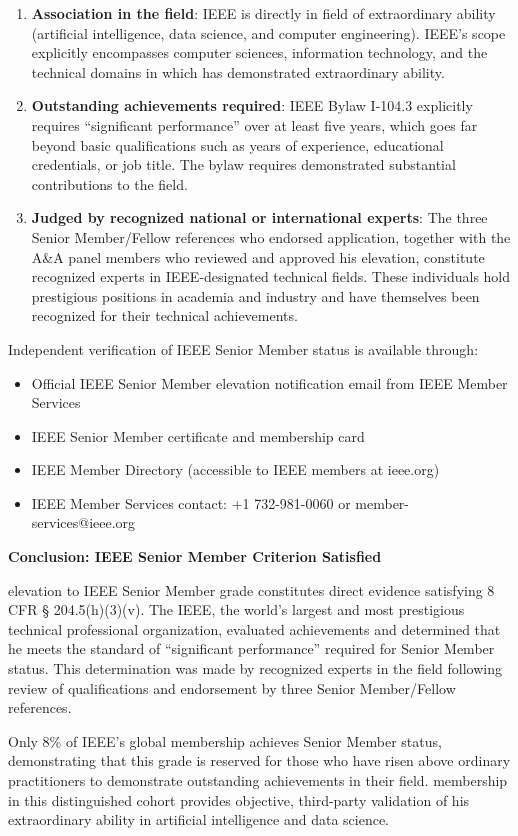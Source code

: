 \begin{enumerate}
    \item \textbf{Association in the field}: IEEE is directly in \drs field of extraordinary ability (artificial intelligence, data science, and computer engineering). IEEE's scope explicitly encompasses computer sciences, information technology, and the technical domains in which \dr has demonstrated extraordinary ability.
    
    \item \textbf{Outstanding achievements required}: IEEE Bylaw I-104.3 explicitly requires ``significant performance'' over at least five years, which goes far beyond basic qualifications such as years of experience, educational credentials, or job title. The bylaw requires demonstrated substantial contributions to the field.
    
    \item \textbf{Judged by recognized national or international experts}: The three Senior Member/Fellow references who endorsed \drs application, together with the A\&A panel members who reviewed and approved his elevation, constitute recognized experts in IEEE-designated technical fields. These individuals hold prestigious positions in academia and industry and have themselves been recognized for their technical achievements.
\end{enumerate}

Independent verification of \drs IEEE Senior Member status is available through:
\begin{itemize}
    \item Official IEEE Senior Member elevation notification email from IEEE Member Services \cite{ieeeseniorresults}
    \item IEEE Senior Member certificate and membership card \cite{ieeemembercard}
    \item IEEE Member Directory (accessible to IEEE members at ieee.org)
    \item IEEE Member Services contact: +1 732-981-0060 or member-services@ieee.org
\end{itemize}


\textbf{Conclusion: IEEE Senior Member Criterion Satisfied}

\drs elevation to IEEE Senior Member grade constitutes direct evidence satisfying 8 CFR § 204.5(h)(3)(v). The IEEE, the world's largest and most prestigious technical professional organization, evaluated \drs achievements and determined that he meets the standard of ``significant performance'' required for Senior Member status. This determination was made by recognized experts in the field following review of \drs qualifications and endorsement by three Senior Member/Fellow references.

Only 8\% of IEEE's global membership achieves Senior Member status, demonstrating that this grade is reserved for those who have risen above ordinary practitioners to demonstrate outstanding achievements in their field. \drs membership in this distinguished cohort provides objective, third-party validation of his extraordinary ability in artificial intelligence and data science.
